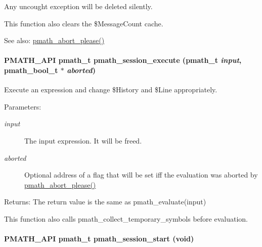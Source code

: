 Any uncought exception will be deleted silently.

This function also clears the \$MessageCount cache.

\begin{Desc}
\item[See also:]\hyperlink{group__threads_g84e45036b76764def6390af12d2070bf}{pmath\_\-abort\_\-please()} \end{Desc}
\hypertarget{group__frontend_g31eb5567282f8a40cab67fac2d14361c}{
\paragraph[{pmath\_\-session\_\-execute}]{\setlength{\rightskip}{0pt plus 5cm}PMATH\_\-API {\bf pmath\_\-t} pmath\_\-session\_\-execute ({\bf pmath\_\-t} {\em input}, \/  {\bf pmath\_\-bool\_\-t} $\ast$ {\em aborted})}\hfill}
\label{group__frontend_g31eb5567282f8a40cab67fac2d14361c}


Execute an expression and change \$History and \$Line appropriately. 

\begin{Desc}
\item[Parameters:]
\begin{description}
\item[{\em input}]The input expression. It will be freed. \item[{\em aborted}]Optional address of a flag that will be set iff the evaluation was aborted by \hyperlink{group__threads_g84e45036b76764def6390af12d2070bf}{pmath\_\-abort\_\-please()} \end{description}
\end{Desc}
\begin{Desc}
\item[Returns:]The return value is the same as pmath\_\-evaluate(input)\end{Desc}
This function also calls pmath\_\-collect\_\-temporary\_\-symbols before evaluation. \hypertarget{group__frontend_ge55417d3114126529937b86befd70824}{
\paragraph[{pmath\_\-session\_\-start}]{\setlength{\rightskip}{0pt plus 5cm}PMATH\_\-API {\bf pmath\_\-t} pmath\_\-session\_\-start (void)}\hfill}
\label{group__frontend_ge55417d3114126529937b86befd70824}


